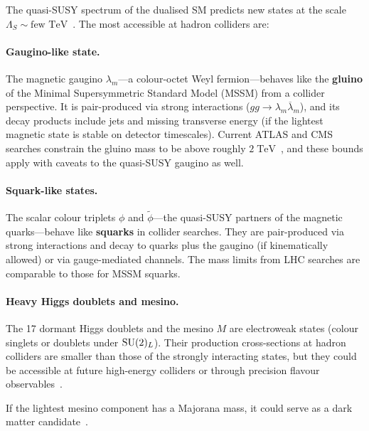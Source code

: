 \documentclass[11pt,a4paper]{article}
\begin{document}
The quasi-SUSY spectrum of the dualised SM predicts new states at the
scale $\Lambda_S \sim \text{few TeV}$~\cite{CacciapagliaSannino2024}.
The most accessible at hadron colliders are:

\paragraph{Gaugino-like state.}
The magnetic gaugino $\lambda_m$---a colour-octet Weyl
fermion---behaves like the \textbf{gluino} of the Minimal
Supersymmetric Standard Model (MSSM) from a collider perspective.  It
is pair-produced via strong interactions ($gg \to \lambda_m
\overline{\lambda}_m$), and its decay products include jets and
missing transverse energy (if the lightest magnetic state is stable on
detector timescales).  Current ATLAS and CMS searches constrain the
gluino mass to be above roughly
$2\;\text{TeV}$~\cite{CacciapagliaSannino2024}, and these bounds
apply with caveats to the quasi-SUSY gaugino as well.

\paragraph{Squark-like states.}
The scalar colour triplets $\phi$ and $\widetilde{\phi}$---the
quasi-SUSY partners of the magnetic quarks---behave like
\textbf{squarks} in collider searches.  They are pair-produced via
strong interactions and decay to quarks plus the gaugino (if
kinematically allowed) or via gauge-mediated channels.  The mass limits
from LHC searches are comparable to those for MSSM squarks.

\paragraph{Heavy Higgs doublets and mesino.}
The 17 dormant Higgs doublets and the mesino $M$ are electroweak states
(colour singlets or doublets under $\mathrm{SU}(2)_L$).  Their production
cross-sections at hadron colliders are smaller than those of the
strongly interacting states, but they could be accessible at future
high-energy colliders or through precision flavour
observables~\cite{CacciapagliaSannino2024}.

If the lightest mesino component has a Majorana mass, it could serve as
a dark matter candidate~\cite{CacciapagliaSannino2024}.
\end{document}
